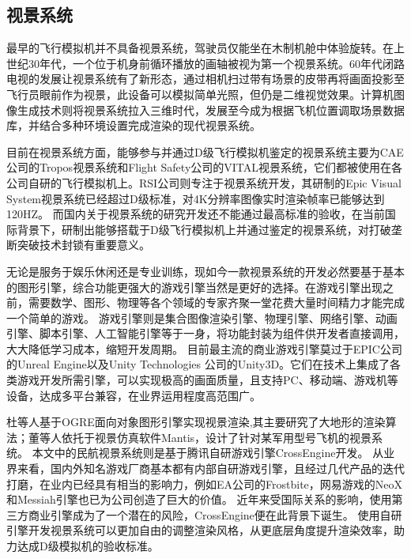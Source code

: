 \subsection{视景系统}
最早的飞行模拟机并不具备视景系统，驾驶员仅能坐在木制机舱中体验旋转。在上世纪30年代，一个位于机身前循环播放的画轴被视为第一个视景系统。60年代闭路电视的发展让视景系统有了新形态，通过相机扫过带有场景的皮带再将画面投影至飞行员眼前作为视景\cite{vishis1}，此设备可以模拟简单光照，但仍是二维视觉效果。计算机图像生成技术则将视景系统拉入三维时代，发展至今成为根据飞机位置调取场景数据库，并结合多种环境设置完成渲染的现代视景系统\cite{vishis2}。
\par
目前在视景系统方面，能够参与并通过D级飞行模拟机鉴定的视景系统主要为CAE公司的Tropos视景系统和Flight Safety公司的VITAL视景系统\cite{vishis3}，它们都被使用在各公司自研的飞行模拟机上。RSI公司则专注于视景系统开发，其研制的Epic Visual System视景系统已经超过D级标准，对4K分辨率图像实时渲染帧率已能够达到120HZ\cite{simhis4}。
而国内关于视景系统的研究开发还不能通过最高标准的验收，在当前国际背景下，研制出能够搭载于D级飞行模拟机上并通过鉴定的视景系统，对打破垄断突破技术封锁有重要意义。
\par
无论是服务于娱乐休闲还是专业训练，现如今一款视景系统的开发必然要基于基本的图形引擎，综合功能更强大的游戏引擎当然是更好的选择。在游戏引擎出现之前，需要数学、图形、物理等各个领域的专家齐聚一堂花费大量时间精力才能完成一个简单的游戏\cite{engine2}。
游戏引擎则是集合图像渲染引擎、物理引擎、网络引擎、动画引擎、脚本引擎、人工智能引擎等于一身，将功能封装为组件供开发者直接调用，大大降低学习成本，缩短开发周期\cite{engine3}。
目前最主流的商业游戏引擎莫过于EPIC公司的Unreal Engine以及Unity Technologies 公司的Unity3D。它们在技术上集成了各类游戏开发所需引擎，可以实现极高的画面质量，且支持PC、移动端、游戏机等设备，达成多平台兼容，在业界运用程度高范围广\cite{engine1}。
\par
杜等人基于OGRE面向对象图形引擎实现视景渲染\cite{engine5},其主要研究了大地形的渲染算法；董等人依托于视景仿真软件Mantis，设计了针对某军用型号飞机的视景系统\cite{engine4}。
本文中的民航视景系统则是基于腾讯自研游戏引擎CrossEngine开发。
从业界来看，国内外知名游戏厂商基本都有内部自研游戏引擎，且经过几代产品的迭代打磨，在业内已经具有相当的影响力，例如EA公司的Frostbite\cite{crossengine}，网易游戏的NeoX和Messiah引擎也已为公司创造了巨大的价值。
近年来受国际关系的影响，使用第三方商业引擎成为了一个潜在的风险，CrossEngine便在此背景下诞生。
使用自研引擎开发视景系统可以更加自由的调整渲染风格，从更底层角度提升渲染效率，助力达成D级模拟机的验收标准。
